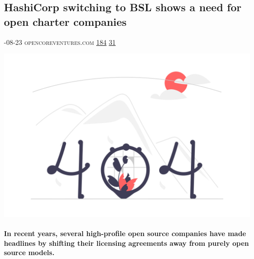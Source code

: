 \documentclass[10pt,a4paper]{article}
\begin{document}
\begin{multicols*}{2}
\begin{minipage}{\linewidth}
\subsection{HashiCorp switching to BSL shows a need for open charter companies}
\textsc{\footnotesize
{\scriptsize\faCalendar}-08-23 
{\scriptsize\faGlobe}\space 
opencoreventures.com 
{\scriptsize\faThumbsOUp}\space 
\href{http://news.ycombinator.com/item?id=37239979\&utm\_term=comment}{184} 
{\scriptsize\faComments}\space 
\href{http://news.ycombinator.com/item?id=37239979\&utm\_term=comment}{31} 
}
\par\medskip\noindent
\href{https://opencoreventures.com/blog/2023-08-23-hashicorp-switching-bsl-shows-need-for-open-charter-companies/?utm\_source=hackernewsletter\&utm\_medium=email\&utm\_term=startup\_news}{
    \includegraphics[width=0.99\linewidth]{notfound.png}
}
\end{minipage}
\paragraph{}
\textbf{In recent years, several high-profile open source companies have made headlines by shifting their licensing agreements away from purely open source models.}

\end{multicols*}
\end{document}
